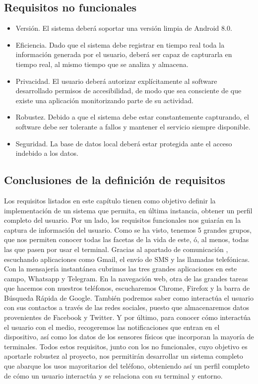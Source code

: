 \documentclass[12pt,a4paper,oneside]{book} %
\begin{document}
\subsection{Requisitos no funcionales}
\begin{itemize}
	\item Versión. El sistema deberá soportar una versión limpia de Android 8.0. 
	\item Eficiencia. Dado que el sistema debe registrar en tiempo real toda la información generada por el usuario, deberá ser capaz de capturarla en tiempo real, al mismo tiempo que se analiza y almacena. 
	\item Privacidad. El usuario deberá autorizar explícitamente al software desarrollado permisos de accesibilidad, de modo que sea consciente de que existe una aplicación monitorizando parte de su actividad.
	\item Robustez. Debido a que el sistema debe estar constantemente capturando, el software debe ser tolerante a fallos y mantener el servicio siempre disponible.  
	\item Seguridad. La base de datos local deberá estar protegida ante el acceso indebido a los datos. 
\end{itemize}
\subsection{Conclusiones de la definición de requisitos}
Los requisitos listados en este capítulo tienen como objetivo definir la implementación de un sistema que permita, en última instancia, obtener un perfil completo del usuario. 
\newline \newline 
Por un lado, los requisitos funcionales nos guiarán en la captura de información del usuario. Como se ha visto, tenemos 5 grandes grupos, que nos permiten conocer todas las facetas de la vida de este, ó, al menos, todas las que pasen por usar el terminal. 
\newline \newline
Gracias al apartado de comunicación , escuchando aplicaciones como Gmail, el envío de SMS y las llamadas telefónicas. Con la mensajería instantánea cubrimos las tres grandes aplicaciones en este campo, Whatsapp y Telegram. En la navegación web, otra de las grandes tareas que hacemos con nuestros teléfonos, escucharemos Chrome, Firefox y la barra de Búsqueda Rápida de Google. 
\newline \newline 
También podremos saber como interactúa el usuario con sus contactos a través de las redes sociales, puesto que almacenaremos datos provenientes de Facebook y Twitter. Y por último, para conocer cómo interactúa el usuario con el medio, recogeremos las notificaciones que entran en el dispositivo, así como los datos de los sensores físicos que incorporan la mayoría de terminales. 
\newline \newline 
Todos estos requisitos, junto con los no funcionales, cuyo objetivo es aportarle robustez al proyecto, nos permitirán desarrollar un sistema completo que abarque los usos mayoritarios del teléfono, obteniendo así un perfil completo de cómo un usuario interactúa y se relaciona con su terminal y entorno. 
\break
\end{document}
